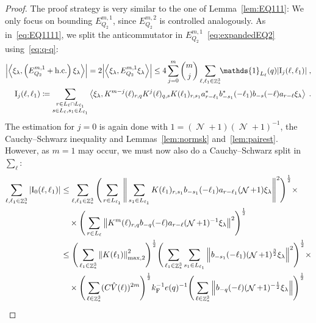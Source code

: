 \documentclass[12pt,a4paper]{article}
\numberwithin{equation}{section}
\newcommand{\1}{\mathbb{I}}
\newcommand{\F}{\mathrm{F}}
\newcommand{\I}{\mathrm{I}}
\DeclareMathOperator{\Z}{\mathbb{Z}}
\DeclareMathOperator{\NN}{\mathcal{N}}
\newcommand{\half}{\frac{1}{2}}
\newcommand{\eva}[1]{\left\langle #1 \right\rangle}
\theoremstyle{plain}
\theoremstyle{definition}
\theoremstyle{remark}
\theoremstyle{plain}
\theoremstyle{definition}
\theoremstyle{remark}
\begin{document}
\begin{proof}
The proof strategy is very similar to the one of Lemma~\ref{lem:EQ111}: We only focus on bounding $ E^{m,1}_{Q_2} $, since $ E^{m,2}_{Q_2} $ is controlled analogously.
As in~\eqref{eq:EQ1111}, we split the anticommutator in $ E^{m,1}_{Q_2} $~\eqref{eq:expandedEQ2} using~\eqref{eq:q-q}:
\begin{equation} \label{eq:EQ2111}
\begin{aligned}
	\abs{\eva{\xi_\lambda,\left(E^{m,1}_{Q_2}+\mathrm{h.c.}\right) \xi_\lambda }} 
	= 2\abs{\eva{\xi_\lambda, E^{m,1}_{Q_2} \xi_\lambda }}
	\le 4 \sum_{j=0}^m {{m}\choose j} \sum\limits_{\ell,\ell_1 \in \Z^3_*}\!\! \mathds{1}_{L_\ell}(q) |\I_j(\ell, \ell_1)| \;,\\
	\I_j(\ell, \ell_1)
	\coloneq \sum\limits_{\substack{r\in L_{\ell} \cap L_{\ell_1}\\ s \in L_{\ell},s_1\in L_{\ell_1}}}
		\eva{\xi_\lambda, K^{m-j}(\ell)_{r,q} K^{j}(\ell)_{q,s} K(\ell_1)_{r,s_1} a^*_{r-\ell_1} b^*_{-s_1}(-\ell_1) b_{-s}(-\ell) a_{r-\ell} \xi_\lambda} \;. \\
\end{aligned}
\end{equation}
The estimation for $ j = 0 $ is again done with \textcolor{green!30!black}{$1 = (\NN+1)(\NN+1)^{-1}$}, the Cauchy--Schwarz inequality and Lemmas~\ref{lem:normsk} and~\ref{lem:pairest}. However, as $ m = 1 $ may occur, we must now also do a Cauchy--Schwarz split in $ \sum_\ell $:
\textcolor{green!30!black}{
\begin{align}
	\sum_{\ell,\ell_1 \in \Z^3_*} |\I_0(\ell, \ell_1)|
 	&\leq \sum\limits_{\ell,\ell_1 \in \Z^3_*} \Bigg( \sum\limits_{r \in L_{\ell_1}} 
 		\Bigg\Vert \sum\limits_{s_1 \in L_{\ell_1}} K(\ell_1)_{r,s_1} b_{-s_1}(-\ell_1) a_{r-\ell_1} (\NN+1) \xi_\lambda \Bigg\Vert^2\Bigg)^\half \times\nonumber\\
 	&\quad \times \Bigg( \sum\limits_{r \in L_\ell} \norm{K^{m}(\ell)_{r,q} b_{-q}(-\ell) a_{r-\ell} (\NN+1)^{-1}\xi_\lambda }^2\Bigg)^\half \nonumber\\
 	&\leq \Bigg( \sum\limits_{\ell_1 \in \Z^3_*} \norm{K(\ell_1)}_{\mathrm{max,2}}^2 \Bigg)^{\half} \Bigg(
 		\sum\limits_{\ell_1 \in \Z^3_*} \sum\limits_{s_1 \in L_{\ell_1}} \norm{ b_{-s_1}(-\ell_1) (\NN+1)^{\frac 32}\xi_\lambda}^2\Bigg)^\half \times\nonumber\\
 	&\quad \times \Bigg( \sum\limits_{\ell \in \Z^3_*}(C \hat{V}(\ell))^{2m} \Bigg)^{\half} k_{\F}^{-1} e(q)^{-1} \Bigg( \sum\limits_{\ell \in \Z^3_*} \norm{b_{-q}(-\ell) (\NN+1)^{-\half} \xi_\lambda } \Bigg)^{\half} \nonumber\\

\end{align}}
\end{proof}
\end{document}
